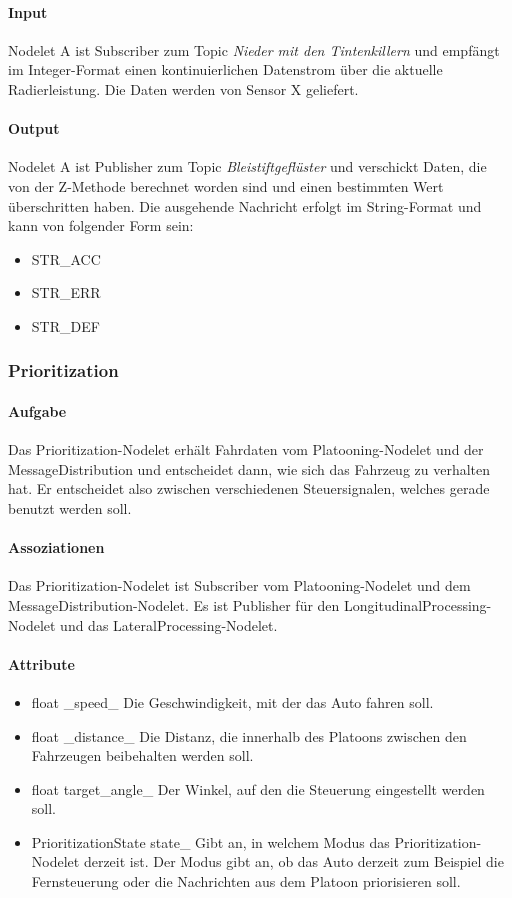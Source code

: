 \documentclass[a4paper, 12pt, titlepage]{scrartcl}
\begin{document}
				\paragraph{Input} Nodelet A ist Subscriber zum Topic \emph{Nieder mit den Tintenkillern} und empfängt im Integer-Format einen kontinuierlichen Datenstrom über die aktuelle Radierleistung. Die Daten werden von Sensor X geliefert. 
				
				\paragraph{Output} Nodelet A ist Publisher zum Topic \emph{Bleistiftgeflüster} und verschickt Daten, die von der Z-Methode berechnet worden sind und einen bestimmten Wert überschritten haben. Die ausgehende Nachricht erfolgt im String-Format und kann von folgender Form sein:
				\begin{itemize}
					\item STR\_ACC
					\item STR\_ERR
					\item STR\_DEF
				\end{itemize}
				
			\subsubsection{Prioritization}
			\label{prioritization}
				\paragraph{Aufgabe} Das Prioritization-Nodelet erhält Fahrdaten vom Platooning-Nodelet und der MessageDistribution und entscheidet dann, wie sich das Fahrzeug zu verhalten hat. Er entscheidet also zwischen verschiedenen Steuersignalen, welches gerade benutzt werden soll. 
				\paragraph{Assoziationen} Das Prioritization-Nodelet ist Subscriber vom Platooning-Nodelet und dem MessageDistribution-Nodelet. Es ist Publisher für den LongitudinalProcessing-Nodelet und das LateralProcessing-Nodelet. 
				\paragraph{Attribute}
					\begin{itemize}
						\item float \_speed\_ Die Geschwindigkeit, mit der das Auto fahren soll.
						\item float \_distance\_ Die Distanz, die innerhalb des Platoons zwischen den Fahrzeugen beibehalten werden soll. 
						\item float target\_angle\_ Der Winkel, auf den die Steuerung eingestellt werden soll.
						\item PrioritizationState state\_ Gibt an, in welchem Modus das Prioritization-Nodelet derzeit ist. Der Modus gibt an, ob das Auto derzeit zum Beispiel die Fernsteuerung oder die Nachrichten aus dem Platoon priorisieren soll. 
					\end{itemize}
\end{document}

